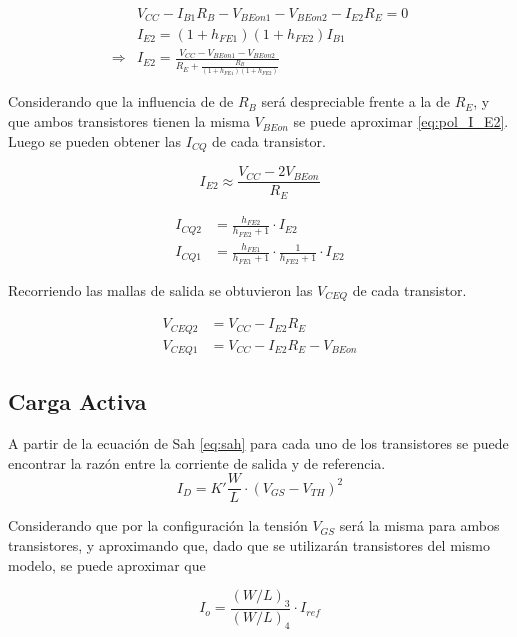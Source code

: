 \begin{align*}
    & V_{CC}-I_{B1}R_{B}-V_{BEon1}-V_{BEon2}-I_{E2}R_{E}=0 \\
    & I_{E2} = \left(1 + h_{FE1}\right)\left(1 + h_{FE2}\right) I_{B1} \\
    \Rightarrow & I_{E2} = \frac{V_{CC}-V_{BEon1}-V_{BEon2}}{R_E+\frac{R_B}{\left(1 + h_{FE1}\right)\left(1 + h_{FE2}\right)}}
\end{align*}

Considerando que la influencia de de $R_B$ será despreciable frente a la de $R_E$, y que ambos transistores tienen la misma $V_{BEon}$ se puede aproximar \eqref{eq:pol_I_E2}. Luego se pueden obtener las $I_{CQ}$ de cada transistor.

\begin{equation}
    I_{E2} \approx \frac{V_{CC}-2V_{BEon}}{R_E}
    \label{eq:pol_I_E2}
\end{equation}

\begin{align}
    I_{CQ2} &= \frac{h_{FE2}}{h_{FE2}+1}\cdot I_{E2} \label{eq:icq2} \\ 
    I_{CQ1} &= \frac{h_{FE1}}{h_{FE1}+1}\cdot \frac{1}{h_{FE2}+1}\cdot I_{E2} \label{eq:icq1}
\end{align}

Recorriendo las mallas de salida se obtuvieron las $V_{CEQ}$ de cada transistor.

\begin{align}
    V_{CEQ2} &= V_{CC} - I_{E2} R_E \\
    V_{CEQ1} &= V_{CC} - I_{E2} R_E - V_{BEon} 
\end{align}

\subsection{Carga Activa}

A partir de la ecuación de Sah \eqref{eq:sah} para cada uno de los transistores se puede encontrar la razón entre la corriente de salida y de referencia.
\begin{equation}
    I_D = K' \frac{W}{L}\cdot (V_{GS}-V_{TH})^2
    \label{eq:sah}
\end{equation}

Considerando que por la configuración la tensión $V_{GS}$ será la misma para ambos transistores, y aproximando que, dado que se utilizarán transistores del mismo modelo, se puede aproximar que 

\begin{equation}
    I_o = \frac{(W/L)_3}{(W/L)_4} \cdot I_{ref}
\end{equation}

